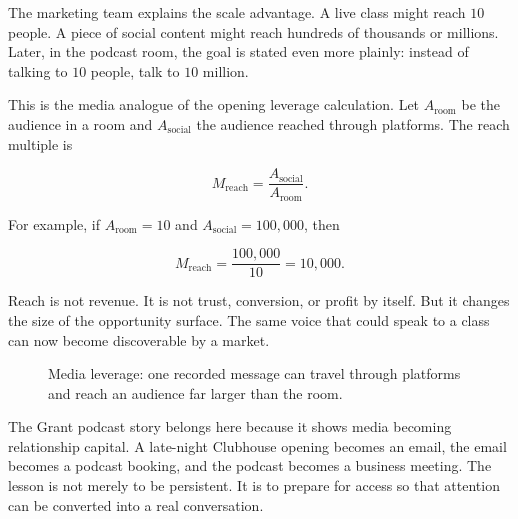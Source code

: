 The marketing team explains the scale advantage. A live class might reach \(10\) people. A piece of social content might reach hundreds of thousands or millions. Later, in the podcast room, the goal is stated even more plainly: instead of talking to \(10\) people, talk to \(10\) million.

This is the media analogue of the opening leverage calculation. Let \(A_{\mathrm{room}}\) be the audience in a room and \(A_{\mathrm{social}}\) the audience reached through platforms. The reach multiple is

\begin{equation}
M_{\mathrm{reach}}
=
\frac{A_{\mathrm{social}}}{A_{\mathrm{room}}}.
\end{equation}

For example, if \(A_{\mathrm{room}}=10\) and \(A_{\mathrm{social}}=100{,}000\), then

\begin{equation}
M_{\mathrm{reach}}
=
\frac{100{,}000}{10}
=
10{,}000.
\end{equation}

Reach is not revenue. It is not trust, conversion, or profit by itself. But it changes the size of the opportunity surface. The same voice that could speak to a class can now become discoverable by a market.

\begin{figure}
\centering
{}
\caption{Media leverage: one recorded message can travel through platforms and reach an audience far larger than the room.}
\end{figure}

The Grant podcast story belongs here because it shows media becoming relationship capital. A late-night Clubhouse opening becomes an email, the email becomes a podcast booking, and the podcast becomes a business meeting. The lesson is not merely to be persistent. It is to prepare for access so that attention can be converted into a real conversation.

